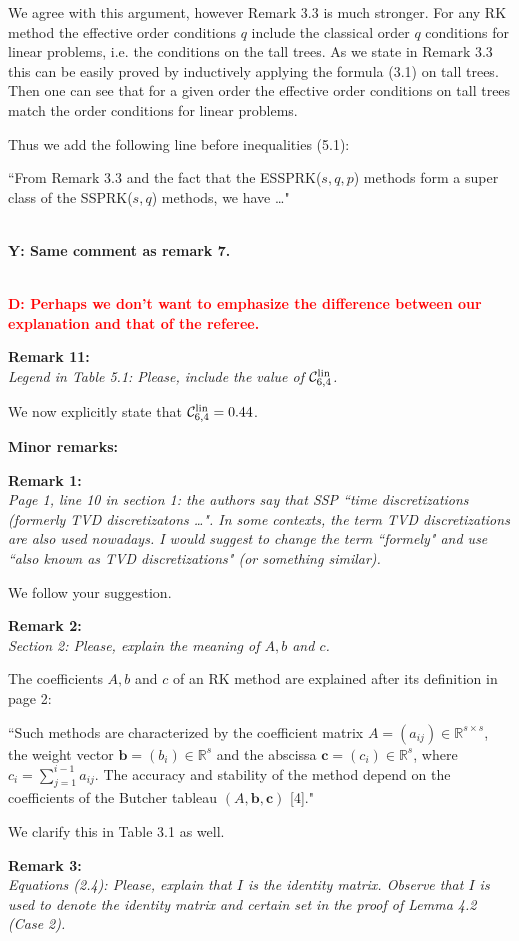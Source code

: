 \documentclass[12pt]{article}
\newcommand{\remark}[2]{\vspace{25pt} \noindent \textbf{Remark #1:\newline} \textit{#2}\vspace{15pt}}
\renewcommand{\newline}{\vspace{15pt}\\}
\newcommand{\sspcoef}{\mathcal{C}}
\newcommand{\david}[1]{\textcolor{red}{\\\textbf{D: \footnotesize #1}\\}}
\newcommand{\yiannis}[1]{\textcolor{OliveGreen}{\\\textbf{Y: \footnotesize #1}\\}}
\begin{document}
We agree with this argument, however Remark 3.3 is much stronger. 
For any RK method the effective order conditions $q$ include the classical order $q$ 
conditions for linear problems, i.e. the conditions on the tall trees. 
As we state in Remark 3.3 this can be easily proved by inductively applying the formula 
(3.1) on tall trees. 
Then one can see that for a given order the effective order conditions on tall trees 
match the order conditions for linear problems.

Thus we add the following line before inequalities (5.1):

``From Remark 3.3 and the fact that the ESSPRK($s,q,p$) methods 
form a super class of the SSPRK($s,q$) methods, we have \dots"

\yiannis{Same comment as remark 7.}

\david{Perhaps we don't want to emphasize the difference between our explanation and that of the referee.}

\remark{11}{
Legend in Table 5.1: Please, include the value of $\sspcoef^{\textnormal{lin}}_{6,4}$.}

We now explicitly state that $\sspcoef^{\textnormal{lin}}_{6,4}=0.44$.
\vspace{20pt}

\noindent \textbf{\large Minor remarks:}

\remark{1}{
Page 1, line 10 in section 1: the authors say that SSP ``time discretizations (formerly
TVD discretizatons \dots". 
In some contexts, the term TVD discretizations are also used nowadays. 
I would suggest to change the term ``formely" and use ``also known as TVD discretizations" 
(or something similar).}

We follow your suggestion.

\remark{2}{
Section 2: Please, explain the meaning of $A, b$ and $c$.}

The coefficients $A, b$ and $c$ of an RK method are explained after its definition in page 2:

``Such methods are characterized by the coefficient matrix $A = (a_{ij}) \in 
\mathbb{R}^{s \times s}$, the weight vector $\bm{b} = (b_i) \in \mathbb{R}^s$
and the abscissa $\bm{c} = (c_i) \in \mathbb{R}^s$, where 
$c_i = \sum_{j=1}^{i-1}a_{ij}$.
The accuracy and stability of the method depend on the coefficients of the 
Butcher tableau $(A,\bm{b},\bm{c})$ [4]."

We clarify this in Table 3.1 as well.

\remark{3}{
Equations (2.4): Please, explain that $I$ is the identity matrix. Observe that $I$ is used to
denote the identity matrix and certain set in the proof of Lemma 4.2 (Case 2).}
\end{document}
